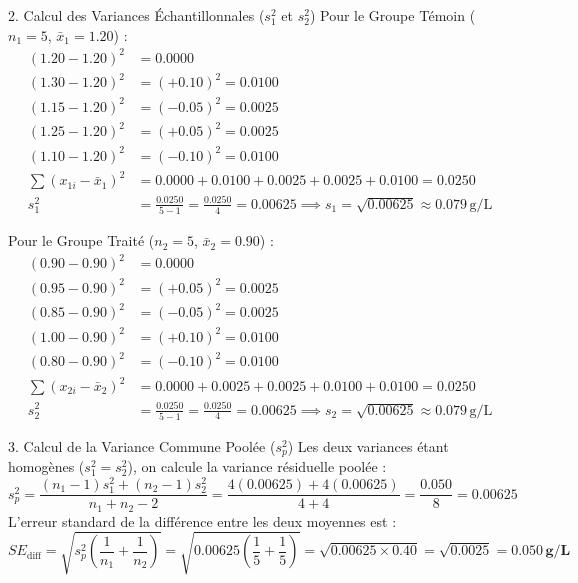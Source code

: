 \documentclass[11pt,a4paper]{article}
\begin{document}
\begin{stepbox}{2. Calcul des Variances Échantillonnales ($s_1^2$ et $s_2^2$)}
Pour le Groupe Témoin ($n_1 = 5$, $\bar{x}_1 = 1.20$) :
\begin{align*}
(1.20 - 1.20)^2 &= 0.0000 \\
(1.30 - 1.20)^2 &= (+0.10)^2 = 0.0100 \\
(1.15 - 1.20)^2 &= (-0.05)^2 = 0.0025 \\
(1.25 - 1.20)^2 &= (+0.05)^2 = 0.0025 \\
(1.10 - 1.20)^2 &= (-0.10)^2 = 0.0100 \\[1mm]
\sum (x_{1i} - \bar{x}_1)^2 &= 0.0000 + 0.0100 + 0.0025 + 0.0025 + 0.0100 = 0.0250 \\[2mm]
s_1^2 &= \frac{0.0250}{5 - 1} = \frac{0.0250}{4} = \mathbf{0.00625} \implies s_1 = \sqrt{0.00625} \approx 0.079\,\text{g/L}
\end{align*}

Pour le Groupe Traité ($n_2 = 5$, $\bar{x}_2 = 0.90$) :
\begin{align*}
(0.90 - 0.90)^2 &= 0.0000 \\
(0.95 - 0.90)^2 &= (+0.05)^2 = 0.0025 \\
(0.85 - 0.90)^2 &= (-0.05)^2 = 0.0025 \\
(1.00 - 0.90)^2 &= (+0.10)^2 = 0.0100 \\
(0.80 - 0.90)^2 &= (-0.10)^2 = 0.0100 \\[1mm]
\sum (x_{2i} - \bar{x}_2)^2 &= 0.0000 + 0.0025 + 0.0025 + 0.0100 + 0.0100 = 0.0250 \\[2mm]
s_2^2 &= \frac{0.0250}{5 - 1} = \frac{0.0250}{4} = \mathbf{0.00625} \implies s_2 = \sqrt{0.00625} \approx 0.079\,\text{g/L}
\end{align*}
\end{stepbox}

\begin{stepbox}{3. Calcul de la Variance Commune Poolée ($s_p^2$)}
Les deux variances étant homogènes ($s_1^2 = s_2^2$), on calcule la variance résiduelle poolée :
\begin{equation*}
s_p^2 = \frac{(n_1 - 1)s_1^2 + (n_2 - 1)s_2^2}{n_1 + n_2 - 2} = \frac{4(0.00625) + 4(0.00625)}{4 + 4} = \frac{0.050}{8} = \mathbf{0.00625}
\end{equation*}
L'erreur standard de la différence entre les deux moyennes est :
\begin{equation*}
SE_{\text{diff}} = \sqrt{s_p^2 \left(\frac{1}{n_1} + \frac{1}{n_2}\right)} = \sqrt{0.00625 \left(\frac{1}{5} + \frac{1}{5}\right)} = \sqrt{0.00625 \times 0.40} = \sqrt{0.0025} = \mathbf{0.050\,\text{g/L}}
\end{equation*}
\end{stepbox}
\end{document}
